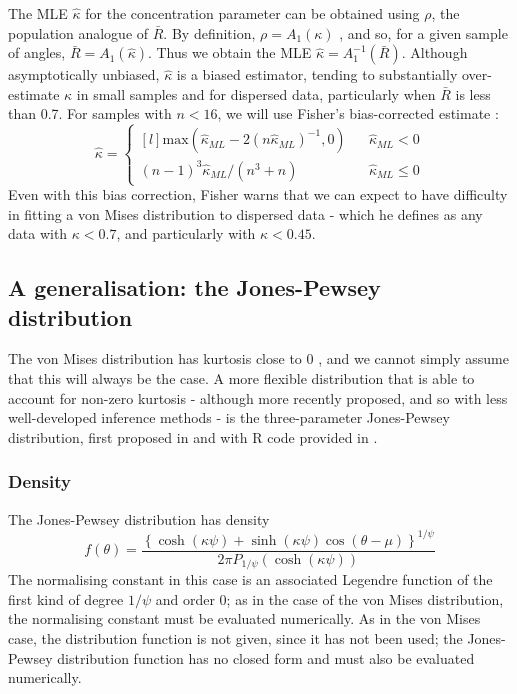 \documentclass[../../ArchStats.tex]{subfiles}
\begin{document}
The MLE $\hat{\kappa}$ for the concentration parameter can be obtained using $\rho$, the population analogue of $\bar{R}$. By definition, $\rho = A_1(\kappa)$ , and so, for a given sample of angles, $\bar{R} = A_1(\hat{\kappa})$.  Thus we obtain the MLE $\hat{\kappa} = A_1^{-1}(\bar{R})$. Although asymptotically unbiased, $\hat{\kappa}$ is a biased estimator, tending to substantially over-estimate $\kappa$ in small samples and for dispersed data, particularly when $\bar{R}$ is less than 0.7. For samples with $n < 16$, we will use Fisher's bias-corrected estimate \cite{Fisher1993}:
\[\hat{\kappa} = \left\lbrace \begin{matrix*}[l]
\text{max} ( \hat{\kappa}_{ML} - 2(n \hat{\kappa}_{ML})^{-1}, 0) & & \hat{\kappa}_{ML} < 0 \\
(n-1)^3 \hat{\kappa}_{ML} / (n^3 + n) & &  \hat{\kappa}_{ML} \leq 0 
\end{matrix*} \right. \]
Even with this bias correction, Fisher warns that we can expect to have difficulty in fitting a von Mises distribution to dispersed data -  which he defines as any data with $\kappa < 0.7$, and particularly with $\kappa < 0.45$. 




\subsection{A generalisation: the Jones-Pewsey distribution}
The von Mises distribution has kurtosis close to 0 \cite[34]{Fisher1993}, and we cannot simply assume that this will always be the case. A more flexible distribution that is able to account for non-zero kurtosis - although more recently proposed, and so with less well-developed inference methods - is the three-parameter Jones-Pewsey distribution, first proposed in \cite{Jones2005} and with R code provided in \cite{Pewsey2014}.

\subsubsection{Density}
The Jones-Pewsey distribution has density
\[f(\theta) = \frac{\left\lbrace \cosh(\kappa\psi) + \sinh(\kappa\psi) \cos(\theta - \mu) \right\rbrace ^ {1/\psi}}{2\pi P_{1/\psi}(\cosh(\kappa\psi))}\]
The normalising constant in this case is an associated Legendre function of the first kind of degree $1/\psi$ and order 0; as in the case of the von Mises distribution, the normalising constant must be evaluated numerically.  As in the von Mises case, the distribution function is not given, since it has not been used; the Jones-Pewsey distribution function has no closed form and must also be evaluated numerically.
\end{document}
